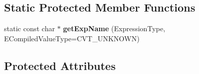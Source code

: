 \subsection*{Static Protected Member Functions}
\begin{DoxyCompactItemize}
\item 
static const char $\ast$ {\bfseries get\+Exp\+Name} (Expression\+Type, E\+Compiled\+Value\+Type=C\+V\+T\+\_\+\+U\+N\+K\+N\+O\+WN)\hypertarget{class_object_script_1_1_o_s_1_1_core_1_1_compiler_a7f536cbef85a7c3473cf5dd177ac9ff2}{}\label{class_object_script_1_1_o_s_1_1_core_1_1_compiler_a7f536cbef85a7c3473cf5dd177ac9ff2}

\end{DoxyCompactItemize}
\subsection*{Protected Attributes}
